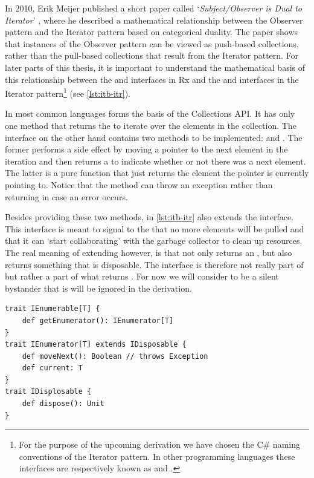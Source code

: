 In 2010, Erik Meijer published a short paper called `\textit{Subject/Observer is Dual to Iterator}' \cite{meijer2010-Observable}, where he described a mathematical relationship between the Observer pattern and the Iterator pattern based on categorical duality. The paper shows that instances of the Observer pattern can be viewed as push-based collections, rather than the pull-based collections that result from the Iterator pattern. For later parts of this thesis, it is important to understand the mathematical basis of this relationship between the \obs and \obv interfaces in Rx and the \ieb and \ier interfaces in the Iterator pattern\footnote{For the purpose of the upcoming derivation we have chosen the C\# naming conventions of the Iterator pattern. In other programming languages these interfaces are respectively known as  and .} (see \autoref{lst:itb-itr}).

In most common languages \ieb forms the basis of the Collections API. It has only one method  that returns the \ier to iterate over the elements in the collection. The \ier interface on the other hand contains two methods to be implemented:  and . The former performs a side effect by moving a pointer to the next element in the iteration and then returns a  to indicate whether or not there was a next element. The latter is a pure function that just returns the element the pointer is currently pointing to. Notice that the  method can throw an exception rather than returning  in case an error occurs.

Besides providing these two methods, \ier in \autoref{lst:itb-itr} also extends the \id interface. This interface is meant to signal to the \ieb that no more elements will be pulled and that it can `start collaborating' with the garbage collector to clean up resources. The real meaning of \ier extending \id however, is that  not only returns an \ier, but also returns something that is disposable. The \id interface is therefore not really part of \ier but rather a part of what  returns \cite{E2E-Rx}. For now we will consider \id to be a silent bystander that is will be ignored in the derivation.

\begin{minipage}{\linewidth}
\begin{lstlisting}[style=ScalaStyle, caption={\ieb and \ier interfaces}, label={lst:itb-itr}]
trait IEnumerable[T] {
    def getEnumerator(): IEnumerator[T]
}
trait IEnumerator[T] extends IDisposable {
    def moveNext(): Boolean // throws Exception
    def current: T
}
trait IDisplosable {
    def dispose(): Unit
}
\end{lstlisting}
\end{minipage}

